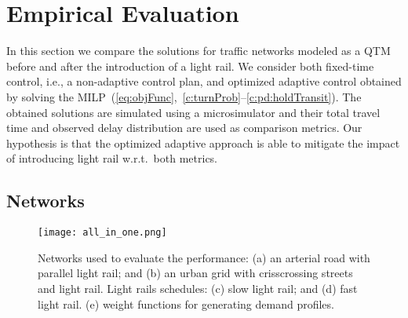 \section{Empirical Evaluation}
  
In this section we compare the solutions for traffic networks modeled as a QTM
before and after the introduction of a light rail.
%
We consider both fixed-time control, i.e., a non-adaptive control plan, and
optimized adaptive control obtained by solving the
MILP~(\ref{eq:objFunc},~\ref{c:turnProb}--\ref{c:pd:holdTransit}).
%
The obtained solutions are simulated using a microsimulator and their total
travel time and observed delay distribution are used as comparison metrics.
%
Our hypothesis is that the optimized adaptive approach is able to mitigate the
impact of introducing light rail w.r.t.\ both metrics.
%






\subsection{Networks}


\begin{figure*}
\centering
\texttt{[image: all\_in\_one.png]}%
%
%
\begin{subfigure}{1em}{\label{fig:net:arterial}}\end{subfigure}%
\begin{subfigure}{1em}{\label{fig:net:grid}}\end{subfigure}%
\begin{subfigure}{1em}{\label{fig:transit1}}\end{subfigure}%
\begin{subfigure}{1em}{\label{fig:transit2}}\end{subfigure}%
\begin{subfigure}{1em}{\label{fig:demand_profiles}}\end{subfigure}%
%
\vspace{-3mm}
%
\caption{Networks used to evaluate the performance: (a) an arterial road with
parallel light rail; and (b) an urban grid with crisscrossing streets and light
rail.
%
Light rails schedules: (c) slow light rail; and (d) fast light rail.
%
(e) weight functions for generating demand profiles.}
%
\vspace{-3mm}
\end{figure*}

